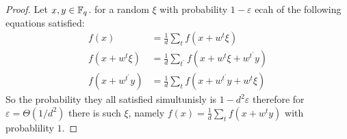 \begin{proof}
  Let $x,y \in \mathbb{F}_{q}$. for a random $\xi$ with probability $1 - \varepsilon$ ecah of the following equations satisfied: 
  \begin{equation*}
    \begin{split}
      f(x) & = \frac{1}{d}\sum_{t}{ f\left( x + w^{t}\xi \right)  } \\
      f\left( x + w^{t}\xi \right)   & = \frac{1}{d} \sum_{t^{\prime}}{ f\left( x + w^{t}\xi + w^{t^{\prime}}y \right)  } \\
      f(x + w^{t^\prime}y) & = \frac{1}{d}\sum_{t}{ f\left( x + w^{t^\prime}y + w^{t}\xi \right)  } 
    \end{split}
  \end{equation*}
  So the probability they all satisfied simultunisly is $ 1 - d^{2}\varepsilon$ therefore  for $\varepsilon =\Theta\left( 1/d^{2} \right)$ there is such $\xi$, namely $f(x)  = \frac{1}{d}\sum_{t}{ f\left( x + w^{t}y \right)  } $ with probablility $1$.
\end{proof}




